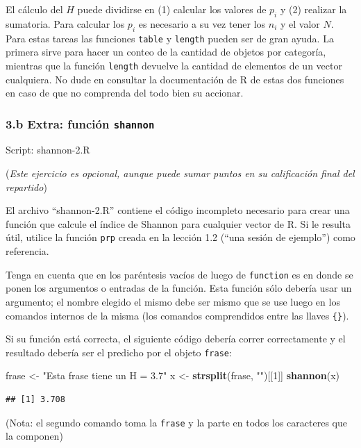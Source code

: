 \documentclass[]{article}
\newenvironment{Shaded}{}{}
\newcommand{\KeywordTok}[1]{\textcolor[rgb]{0.00,0.44,0.13}{\textbf{{#1}}}}
\newcommand{\DecValTok}[1]{\textcolor[rgb]{0.25,0.63,0.44}{{#1}}}
\newcommand{\StringTok}[1]{\textcolor[rgb]{0.25,0.44,0.63}{{#1}}}
\newcommand{\NormalTok}[1]{{#1}}
\begin{document}
El cálculo del $H$ puede dividirse en (1) calcular los valores de $p_i$
y (2) realizar la sumatoria. Para calcular los $p_i$ es necesario a su
vez tener los $n_i$ y el valor $N$. Para estas tareas las funciones
\texttt{table} y \texttt{length} pueden ser de gran ayuda. La primera
sirve para hacer un conteo de la cantidad de objetos por categoría,
mientras que la función \texttt{length} devuelve la cantidad de
elementos de un vector cualquiera. No dude en consultar la documentación
de R de estas dos funciones en caso de que no comprenda del todo bien su
accionar.

\subsubsection{3.b Extra: función \texttt{shannon}}

Script: shannon-2.R

(\emph{Este ejercicio es opcional, aunque puede sumar puntos en su
calificación final del repartido})

El archivo ``shannon-2.R'' contiene el código incompleto necesario para
crear una función que calcule el índice de Shannon para cualquier vector
de R. Si le resulta útil, utilice la función \texttt{prp} creada en la
lección 1.2 (``una sesión de ejemplo'') como referencia.

Tenga en cuenta que en los paréntesis vacíos de luego de
\texttt{function} es en donde se ponen los argumentos o entradas de la
función. Esta función sólo debería usar un argumento; el nombre elegido
el mismo debe ser mismo que se use luego en los comandos internos de la
misma (los comandos comprendidos entre las llaves \texttt{\{\}}).

Si su función está correcta, el siguiente código debería correr
correctamente y el resultado debería ser el predicho por el objeto
\texttt{frase}:

\begin{Shaded}
\begin{Highlighting}[]
\NormalTok{frase <- }\StringTok{"Esta frase tiene un H = 3.7"}
\NormalTok{x <- }\KeywordTok{strsplit}\NormalTok{(frase, }\StringTok{""}\NormalTok{)[[}\DecValTok{1}\NormalTok{]]}
\KeywordTok{shannon}\NormalTok{(x)}
\end{Highlighting}
\end{Shaded}
\begin{verbatim}
## [1] 3.708
\end{verbatim}
(Nota: el segundo comando toma la \texttt{frase} y la parte en todos los
caracteres que la componen)
\end{document}
